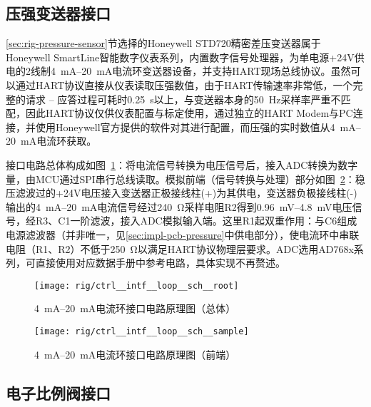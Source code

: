 \subsection{压强变送器接口}\label{sec:rig-ctrl-intf-loop}

\ref{sec:rig-pressure-sensor}节选择的Honeywell STD720精密差压变送器属于Honeywell SmartLine智能数字仪表系列，内置数字信号处理器，为单电源+24V供电的2线制\SIrange{4}{20}{\mA}电流环变送器设备，并支持HART现场总线协议。虽然可以通过HART协议直接从仪表读取压强数值，由于HART传输速率非常低，一个完整的请求 -- 应答过程可耗时\SI{0.25}{\s}以上，与变送器本身的\SI{50}{\Hz}采样率严重不匹配，因此HART协议仅供仪表配置与标定使用，通过独立的HART Modem与PC连接，并使用Honeywell官方提供的软件对其进行配置，而压强的实时数值从\SIrange{4}{20}{\mA}电流环获取。

接口电路总体构成如图~\ref{fig:rig-ctrl-intf-loop-sch-root}：将电流信号转换为电压信号后，接入ADC转换为数字量，由MCU通过SPI串行总线读取。模拟前端（信号转换与处理）部分如图~\ref{fig:rig-ctrl-intf-loop-sch-sample}：稳压滤波过的+24V电压接入变送器正极接线柱(+)为其供电，变送器负极接线柱(-)输出的\SIrange{4}{20}{\mA}电流信号经过\SI{240}{\ohm}采样电阻R2得到\SIrange{0.96}{4.8}{\mV}电压信号，经R3、C1一阶滤波，接入ADC模拟输入端。这里R1起双重作用：与C6组成电源滤波器（并非唯一，见\ref{sec:impl-pcb-pressure}中供电部分），使电流环中串联电阻（R1、R2）不低于\SI{250}{\ohm}以满足HART协议物理层要求。ADC选用AD768x系列\footnotemark{}，可直接使用对应数据手册中参考电路，具体实现不再赘述。


\begin{figure}[tb]
\centering
\texttt{[image: rig/ctrl\_\_intf\_\_loop\_\_sch\_\_root]}
\caption{\SIrange{4}{20}{\mA}电流环接口电路原理图（总体）}
\label{fig:rig-ctrl-intf-loop-sch-root}
\end{figure}

\begin{figure}[tb]
\centering
\texttt{[image: rig/ctrl\_\_intf\_\_loop\_\_sch\_\_sample]}
\caption{\SIrange{4}{20}{\mA}电流环接口电路原理图（前端）}
\label{fig:rig-ctrl-intf-loop-sch-sample}
\end{figure}

\subsection{电子比例阀接口}\label{sec:rig-ctrl-intf-reg}

